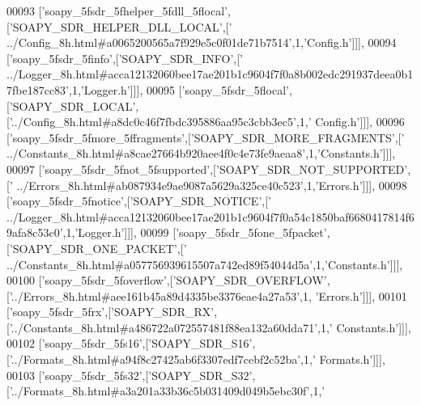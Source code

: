 \begin{DoxyCode}
00093   [\textcolor{stringliteral}{'soapy\_5fsdr\_5fhelper\_5fdll\_5flocal'},[\textcolor{stringliteral}{'SOAPY\_SDR\_HELPER\_DLL\_LOCAL'},[\textcolor{stringliteral}{'
      ../Config\_8h.html#a0065200565a7f929e5c0f01de71b7514'},1,\textcolor{stringliteral}{'Config.h'}]]],
00094   [\textcolor{stringliteral}{'soapy\_5fsdr\_5finfo'},[\textcolor{stringliteral}{'SOAPY\_SDR\_INFO'},[\textcolor{stringliteral}{'
      ../Logger\_8h.html#acca12132060bee17ae201b1c9604f7f0a8b002edc291937deea0b17fbe187cc83'},1,\textcolor{stringliteral}{'Logger.h'}]]],
00095   [\textcolor{stringliteral}{'soapy\_5fsdr\_5flocal'},[\textcolor{stringliteral}{'SOAPY\_SDR\_LOCAL'},[\textcolor{stringliteral}{'../Config\_8h.html#a8dc0c46f7fbdc395886aa95c3cbb3ec5'},1,\textcolor{stringliteral}{'
      Config.h'}]]],
00096   [\textcolor{stringliteral}{'soapy\_5fsdr\_5fmore\_5ffragments'},[\textcolor{stringliteral}{'SOAPY\_SDR\_MORE\_FRAGMENTS'},[\textcolor{stringliteral}{'
      ../Constants\_8h.html#a8cae27664b920aee4f0c4e73fe9aeaa8'},1,\textcolor{stringliteral}{'Constants.h'}]]],
00097   [\textcolor{stringliteral}{'soapy\_5fsdr\_5fnot\_5fsupported'},[\textcolor{stringliteral}{'SOAPY\_SDR\_NOT\_SUPPORTED'},[\textcolor{stringliteral}{'
      ../Errors\_8h.html#ab087934e9ae9087a5629a325ce40c523'},1,\textcolor{stringliteral}{'Errors.h'}]]],
00098   [\textcolor{stringliteral}{'soapy\_5fsdr\_5fnotice'},[\textcolor{stringliteral}{'SOAPY\_SDR\_NOTICE'},[\textcolor{stringliteral}{'
      ../Logger\_8h.html#acca12132060bee17ae201b1c9604f7f0a54c1850baf6680417814f69afa8c53c0'},1,\textcolor{stringliteral}{'Logger.h'}]]],
00099   [\textcolor{stringliteral}{'soapy\_5fsdr\_5fone\_5fpacket'},[\textcolor{stringliteral}{'SOAPY\_SDR\_ONE\_PACKET'},[\textcolor{stringliteral}{'
      ../Constants\_8h.html#a057756939615507a742ed89f54044d5a'},1,\textcolor{stringliteral}{'Constants.h'}]]],
00100   [\textcolor{stringliteral}{'soapy\_5fsdr\_5foverflow'},[\textcolor{stringliteral}{'SOAPY\_SDR\_OVERFLOW'},[\textcolor{stringliteral}{'../Errors\_8h.html#aee161b45a89d4335be3376eae4a27a53'},1,\textcolor{stringliteral}{
      'Errors.h'}]]],
00101   [\textcolor{stringliteral}{'soapy\_5fsdr\_5frx'},[\textcolor{stringliteral}{'SOAPY\_SDR\_RX'},[\textcolor{stringliteral}{'../Constants\_8h.html#a486722a072557481f88ea132a60dda71'},1,\textcolor{stringliteral}{'
      Constants.h'}]]],
00102   [\textcolor{stringliteral}{'soapy\_5fsdr\_5fs16'},[\textcolor{stringliteral}{'SOAPY\_SDR\_S16'},[\textcolor{stringliteral}{'../Formats\_8h.html#a94f8c27425ab6f3307edf7cebf2c52ba'},1,\textcolor{stringliteral}{'
      Formats.h'}]]],
00103   [\textcolor{stringliteral}{'soapy\_5fsdr\_5fs32'},[\textcolor{stringliteral}{'SOAPY\_SDR\_S32'},[\textcolor{stringliteral}{'../Formats\_8h.html#a3a201a33b36c5b031409d049b5ebc30f'},1,\textcolor{stringliteral}{'
}
\end{DoxyCode}

